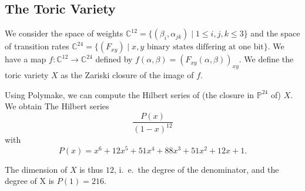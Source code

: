 \subsection*{The Toric Variety}

We consider the space of weights $\mathbb C^{12} = \{(\beta_{i},\alpha_{jk})\mid 1\leq i,j,k\leq 3\}$ and the space of transition rates $\mathbb C^{24} = \{(F_{xy}) \mid x,y \text{ binary states differing at one bit}\}$. We have a map
$f\colon \mathbb C^{12}\to \mathbb C^{24}$ defined by $f(\alpha,\beta) = (F_{xy}(\alpha,\beta))_{xy}$. We define the toric variety $X$ as the Zariski closure of the image of $f$.

Using Polymake, we can compute the Hilbert series of (the closure in $\mathbb P^{24}$ of) $X$. We obtain The Hilbert series
	\[\frac{P(x)}{(1-x)^{12}}\]
with \[P(x)=x^6 + 12x^5 + 51x^4 + 88x^3 + 51x^2 + 12x + 1.\]

The dimension of $X$ is thus $12$, i.\ e.\ the degree of the denominator, and the degree of X is $P(1)=216$.